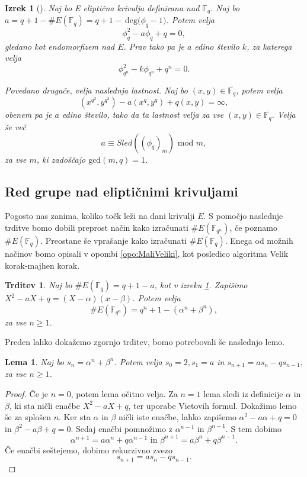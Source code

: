 \documentclass[12pt,a4paper,twoside]{article}
\theoremstyle{definition} %
\theoremstyle{plain} %
\newtheorem{lema}[definicija]{Lema}
\newtheorem{izrek}[definicija]{Izrek}
\newtheorem{trditev}[definicija]{Trditev}
\numberwithin{equation}{section}  %
\newcommand{\F}{\mathbb F}
\newcommand{\E}[1]{E({#1})}
\newcommand{\DEG}[1]{\ \text{deg(}{#1}\text{)}}
\begin{document}
\begin{izrek}[]
\label{izrek:4.10}
Naj bo E eliptična krivulja definirana nad $\F_q$. Naj bo $a = q+1-\#\E{\F_q} = q+1-\DEG{\phi_q-1}$. Potem velja
$$\phi^2_q-a\phi_q+q = 0,$$
gledano kot endomorfizem nad $E$. Prav tako pa je $a$ edino število $k$, za katerega velja
$$\phi^2_{q^n}-k\phi_{q^n}+q^n = 0.$$

Povedano drugače, velja naslednja lastnost. Naj bo $(x,y) \in  \overline{\F_q}$, potem velja
$$(x^{q^2},y^{q^2})-a(x^q,y^q)+q(x,y) = \infty,$$
obenem pa je $a$ edino število, tako da ta lastnost velja za vse $(x,y) \in \overline{\F_q} $. Velja še več
$$a \equiv Sled((\phi_q)_m) \text{ mod } m,$$
za vse $m$, ki zadoščajo $\text{gcd}(m,q)=1$.

\end{izrek}

\subsection{Red grupe nad eliptičnimi krivuljami}


Pogosto nas zanima, koliko točk leži na dani krivulji $E$. S pomočjo naslednje trditve bomo dobili preprost način kako izračunati $\# \E{\F_{q^n}}$, če poznamo $\# \E{\F_q}$.
Preostane še vprašanje kako izračunati $\# \E{\F_q}$. Enega od možnih načinov bomo opisali v opombi \ref{opo:MaliVeliki}, kot posledico algoritma Velik korak-majhen korak.




\begin{trditev}
\label{trd:4.12}
Naj bo $\# \E{\F_q} = q+1-a$, kot v izreku \ref{izrek:4.10}. Zapišimo $X^2-aX+q = (X-\alpha)(x-\beta)$. Potem velja
$$\# \E{\F_{q^{n}}} = q^n+1-(\alpha^n+\beta^n),$$
za vse $n \geq 1$.

\end{trditev}

Preden lahko dokažemo zgornjo trditev, bomo potrebovali še naslednjo lemo.

\begin{lema}
\label{lema:4.13}
Naj bo $s_n = \alpha^n +  \beta^n$. Potem velja $s_0 = 2,s_1 = a$ in $ s_{n+1} = as_n-qs_{n-1}$, za vse $n \geq 1$.

\end{lema}

\begin{proof}
Če je $n = 0$, potem lema očitno velja. Za $n=1$ lema sledi iz definicije $\alpha$ in $\beta$, ki sta ničli enačbe $X^2-aX+q$, ter uporabe Vietovih formul. Dokažimo lemo še za splošen $n$.
Ker sta $\alpha$ in $\beta$ ničli iste enačbe, lahko zapišemo $\alpha^2-a\alpha +q = 0$ in $\beta^2-a\beta+q=0$. Sedaj enačbi pomnožimo z $\alpha^{n-1}$ in $\beta^{n-1}$. S tem dobimo
$$\alpha^{n+1} = a\alpha^n +q\alpha^{n-1}\text{ in } \beta^{n+1} = a\beta^n +q\beta^{n-1}.$$
Če enačbi seštejemo, dobimo rekurzivno zvezo
$$s_{n+1} = as_n-qs_{n-1}.$$
\end{proof}
\end{document}
